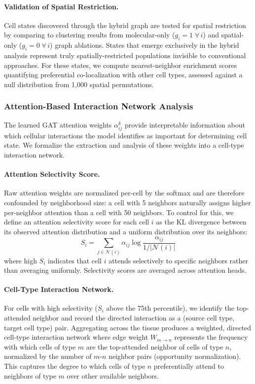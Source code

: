 \documentclass{article}
\begin{document}
\paragraph{Validation of Spatial Restriction.} Cell states discovered through the hybrid graph are tested for spatial restriction by comparing to clustering results from molecular-only ($g_i = 1 \;\forall\, i$) and spatial-only ($g_i = 0 \;\forall\, i$) graph ablations. States that emerge exclusively in the hybrid analysis represent truly spatially-restricted populations invisible to conventional approaches. For these states, we compute nearest-neighbor enrichment scores quantifying preferential co-localization with other cell types, assessed against a null distribution from 1{,}000 spatial permutations.


\subsubsection{Attention-Based Interaction Network Analysis}

The learned GAT attention weights $\alpha_{ij}^k$ provide interpretable information about which cellular interactions the model identifies as important for determining cell state. We formalize the extraction and analysis of these weights into a cell-type interaction network.

\paragraph{Attention Selectivity Score.} Raw attention weights are normalized per-cell by the softmax and are therefore confounded by neighborhood size: a cell with 5 neighbors naturally assigns higher per-neighbor attention than a cell with 50 neighbors. To control for this, we define an attention selectivity score for each cell $i$ as the KL divergence between its observed attention distribution and a uniform distribution over its neighbors:
\begin{equation}
    S_i = \sum_{j \in \mathcal{N}(i)} \alpha_{ij} \log \frac{\alpha_{ij}}{1 / |\mathcal{N}(i)|}
    \label{eq:selectivity}
\end{equation}
where high $S_i$ indicates that cell $i$ attends selectively to specific neighbors rather than averaging uniformly. Selectivity scores are averaged across attention heads.

\paragraph{Cell-Type Interaction Network.} For cells with high selectivity ($S_i$ above the 75th percentile), we identify the top-attended neighbor and record the directed interaction as a (source cell type, target cell type) pair. Aggregating across the tissue produces a weighted, directed cell-type interaction network where edge weight $W_{m \to n}$ represents the frequency with which cells of type $m$ are the top-attended neighbor of cells of type $n$, normalized by the number of $m$-$n$ neighbor pairs (opportunity normalization). This captures the degree to which cells of type $n$ preferentially attend to neighbors of type $m$ over other available neighbors.
\end{document}
